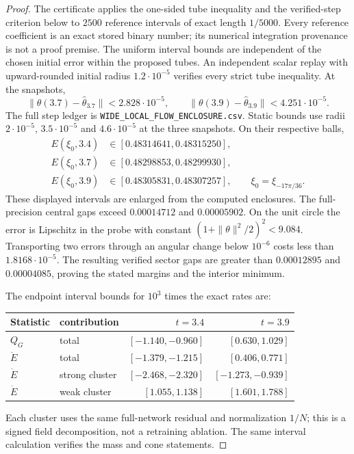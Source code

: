 \begin{proof}
The certificate applies the one-sided tube inequality and the verified-step
criterion below to $2500$ reference intervals of exact length $1/5000$.
Every reference coefficient is an exact stored binary number; its numerical
integration provenance is not a proof premise. The uniform interval bounds
are independent of the chosen initial error within the proposed tubes.
An independent scalar replay with upward-rounded initial radius
$1.2\cdot10^{-5}$ verifies every strict tube inequality. At the snapshots,
\[
 \|\theta(3.7)-\widehat\theta_{3.7}\|<2.828\cdot10^{-5},\qquad
 \|\theta(3.9)-\widehat\theta_{3.9}\|<4.251\cdot10^{-5}.
\]
The full step ledger is \texttt{WIDE\_LOCAL\_FLOW\_ENCLOSURE.csv}.
Static bounds use radii $2\cdot10^{-5}$, $3.5\cdot10^{-5}$ and
$4.6\cdot10^{-5}$ at the three snapshots. On their respective balls,
\begin{align*}
 E(\xi_0,3.4)&\in[0.48314641,0.48315250],\\
 E(\xi_0,3.7)&\in[0.48298853,0.48299930],\\
 E(\xi_0,3.9)&\in[0.48305831,0.48307257],
 \qquad \xi_0=\xi_{-17\pi/36}.
\end{align*}
These displayed intervals are enlarged from the computed enclosures.
The full-precision central gaps exceed $0.00014712$ and $0.00005902$.
On the unit circle the error is Lipschitz in the probe with constant
$(1+\|\theta\|^2/2)^2<9.084$. Transporting two errors through an angular
change below $10^{-6}$ costs less than $1.8168\cdot10^{-5}$.
The resulting verified sector gaps are greater than $0.00012895$ and
$0.00004085$, proving the stated margins and the interior minimum.

The endpoint interval bounds for $10^3$ times the exact rates are:
\begin{center}
\begin{tabular}{llrr}
\toprule
Statistic & contribution & $t=3.4$ & $t=3.9$\\
\midrule
$Q_G$ & total & $[-1.140,-0.960]$ & $[0.630,1.029]$\\
$\dot E$ & total & $[-1.379,-1.215]$ & $[0.406,0.771]$\\
$\dot E$ & strong cluster & $[-2.468,-2.320]$ & $[-1.273,-0.939]$\\
$\dot E$ & weak cluster & $[1.055,1.138]$ & $[1.601,1.788]$\\
\bottomrule
\end{tabular}
\end{center}
Each cluster uses the same full-network residual and normalization $1/N$;
this is a signed field decomposition, not a retraining ablation.
The same interval calculation verifies the mass and cone statements.


\end{proof}
